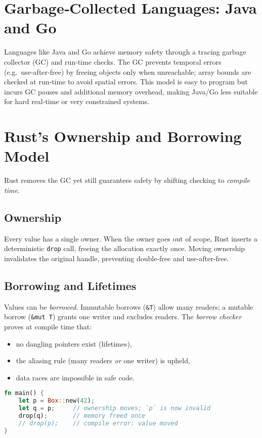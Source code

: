 \documentclass[11pt]{article}
\begin{document}
\section{Garbage‑Collected Languages: Java and Go}
Languages like Java and Go achieve memory safety through a tracing garbage
collector (GC) and run‑time checks.
The GC prevents temporal errors (e.g.\ use‑after‑free) by freeing objects only
when unreachable; array bounds are checked at run‑time to avoid spatial errors.
This model is easy to program but incurs GC pauses and additional memory
overhead, making Java/Go less suitable for hard real‑time or very constrained
systems.

\section{Rust’s Ownership and Borrowing Model}
Rust removes the GC yet still guarantees safety by shifting checking to
\emph{compile time}.

\subsection{Ownership}
Every value has a single owner.
When the owner goes out of scope, Rust inserts a deterministic
\texttt{drop} call, freeing the allocation exactly once.
Moving ownership invalidates the original handle, preventing double‑free and
use‑after‑free.

\subsection{Borrowing and Lifetimes}
Values can be \emph{borrowed}.
Immutable borrows (\texttt{\&T}) allow many readers; a mutable borrow
(\texttt{\&mut T}) grants one writer and excludes readers.
The \emph{borrow checker} proves at compile time that:
\begin{itemize}
    \item no dangling pointers exist (lifetimes),
    \item the aliasing rule (many readers \emph{or} one writer) is upheld,
    \item data races are impossible in safe code.
\end{itemize}

\begin{lstlisting}[language=Rust,caption={Ownership prevents double‑free},label={lst:rust_df}]
fn main() {
    let p = Box::new(42);
    let q = p;     // ownership moves; `p` is now invalid
    drop(q);       // memory freed once
    // drop(p);    // compile error: value moved
}
\end{lstlisting}
\end{document}
